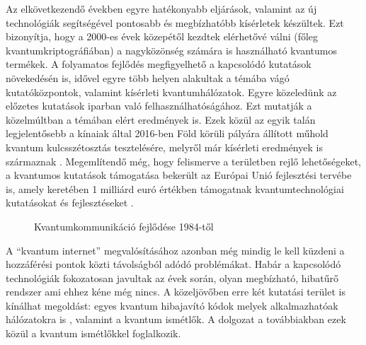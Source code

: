  Az elkövetkezendő években egyre hatékonyabb eljárások, valamint az új technológiák segítségével pontosabb és megbízhatóbb kísérletek készültek. Ezt bizonyítja, hogy a 2000-es évek közepétől kezdtek elérhetővé válni (főleg kvantumkriptográfiában) a nagyközönség számára is használható kvantumos termékek. A folyamatos fejlődés megfigyelhető a kapcsolódó kutatások növekedésén is, idővel egyre több helyen alakultak a témába vágó kutatóközpontok, valamint kísérleti kvantumhálózatok. Egyre közeledünk az előzetes kutatások iparban való felhasználhatóságához. Ezt mutatják a közelmúltban a témában elért eredmények is. Ezek közül az egyik talán legjelentősebb a kínaiak által 2016-ben Föld körüli pályára állított műhold \cite{chinasat} kvantum kulcsszétosztás tesztelésére, melyről már kísérleti eredmények is származnak \cite{yin2017satellite}. Megemlítendő még, hogy felismerve a területben rejlő lehetőségeket, a kvantumos kutatások támogatása bekerült az Európai Unió fejlesztési tervébe is, amely keretében 1 milliárd euró értékben támogatnak kvantumtechnológiai kutatásokat és fejlesztéseket \cite{manifesto}.\\
 \begin{figure}[h]
\centering
{}
\caption[Kvantumkommunikáció timeline]{Kvantumkommunikáció fejlődése 1984-től}
\end{figure}
A ``kvantum internet'' \cite{kimble2008quantum}\cite{pirandola2016unite} megvalósításához azonban még mindig le kell küzdeni a hozzáférési pontok közti távolságból adódó problémákat. Habár a kapcsolódó technológiák fokozatosan javultak az évek során, olyan megbízható, hibatűrő rendszer ami ehhez kéne még nincs. A közeljövőben erre két kutatási terület is kínálhat megoldást: egyes kvantum hibajavító kódok \cite{lidar2013quantum} melyek alkalmazhatóak hálózatokra is \cite{zhang2013quantum}, valamint a kvantum ismétlők\cite{uphoff2016integrated}\cite{krovi2016practical}\cite{pfister2016quantum}\cite{li2016heralded}. A dolgozat a továbbiakban ezek közül a kvantum ismétlőkkel foglalkozik. 



